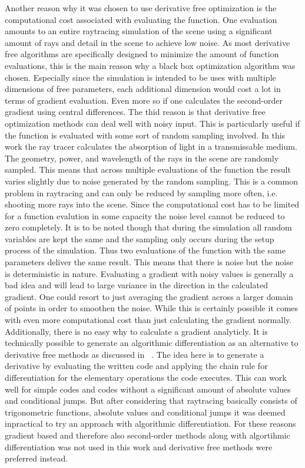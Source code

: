 \documentclass[a4paper,10pt]{article}
\begin{document}
    Another reason why it was chosen to use derivative free optimization
    is the computational cost associated with evaluating the function.
    One evaluation amounts to an entire raytracing simulation of the
    scene using a significant amount of rays and detail in the scene
    to achieve low noise.
    As most derivative free algorithms are specifically designed to
    minimize the amount of function evaluations, this is the
    main reason why a black box optimization algorithm was chosen.
    Especially since the simulation is intended to be uses with multiple
    dimensions of free parameters, each additional dimension would
    cost a lot in terms of gradient evaluation.
    Even more so if one calculates the second-order gradient using
    central differences.
    The thid reason is that derivative free optimization methods
    can deal well with noisy input.
    This is particularly useful if the function is evaluated
    with some sort of random sampling involved.
    In this work the ray tracer calculates the absorption of light in a
    transmissable medium.
    The geometry, power, and wavelength of the rays in the scene are
    randomly sampled.
    This means that across multiple evaluations of the function the
    result varies slightly due to noise generated by the random sampling.
    This is a common problem in raytracing and can only be reduced by
    sampling more often, i.e. shooting more rays into the scene.
    Since the computational cost has to be limited for a function
    evalution in some capacity the noise level cannot be reduced
    to zero completely.
    It is to be noted though that during the simulation all
    random variables are kept the same and the sampling only
    occurs during the setup process of the simulation.
    Thus two evaluations of the function with the same parameters
    deliver the same result.
    This means that there is noise but the noise is deterministic
    in nature.
    Evaluating a gradient with noisy values is generally a bad idea
    and will lead to large variance in the direction in the 
    calculated gradient.
    One could resort to just averaging the gradient across a
    larger domain of points in order to smoothen the noise.
    While this is certainly possible it comes with even more
    computational cost than just calculating the gradient normally.
    Additionally, there is no easy why to calculate a gradient
    analyticly.
    It is technically possible to generate an algorithmic
    differentiation as an alternative to derivative free 
    methods as discussed in ~\cite{derivative_free_methods}.
    The idea here is to generate a derivative by evaluating the
    written code and applying the chain rule for differentiation
    for the elementary operations the code executes.
    This can work well for simple codes and codes without a
    significant amount of absolute values and conditional jumps.
    But after considering that raytracing basically consists of
    trigonometric functions, absolute values and conditional jumps
    it was deemed inpractical to try an approach with algorithmic
    differentiation.
    For these reasons gradient based and therefore also second-order
    methods along with algortihmic differentiation was not used in
    this work and derivative free methods were preferred instead.
\end{document}
